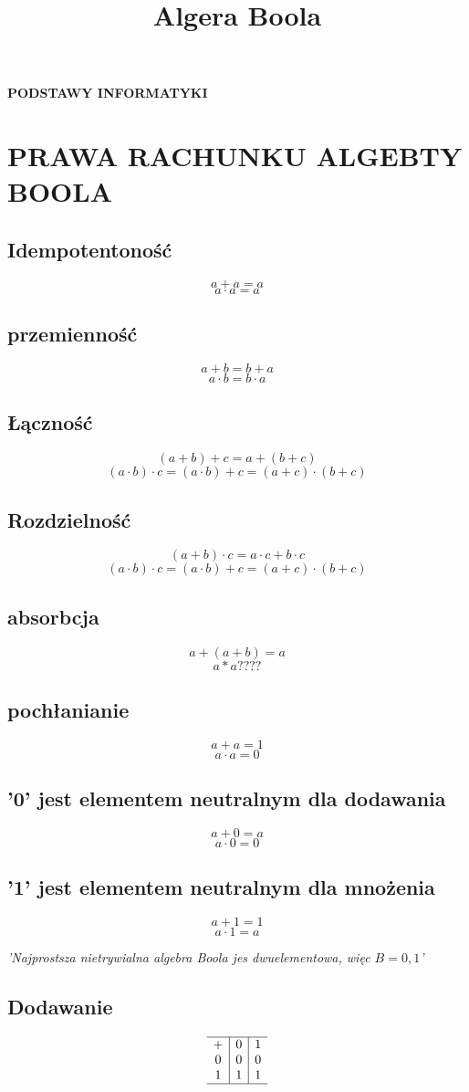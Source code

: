 \documentclass{article}
\title{Algera Boola}
\begin{document}
\begin{titlepage}
    \begin{center}
        \vspace*{1cm}
        
        \Huge

        \textbf{PODSTAWY INFORMATYKI}
        
        \vspace{3cm}
    \end{center}
\end{titlepage}
\newpage
\section{PRAWA RACHUNKU ALGEBTY BOOLA}
\subsection{Idempotentoność}
\[a + a = a\]
\[a \cdot a = a\]
\subsection{przemienność}
\[a + b = b + a\]
\[a \cdot b = b \cdot a\]
\subsection{Łączność}
\[(a + b) + c = a + (b + c)\]
\[(a \cdot b) \cdot c = (a \cdot b) + c = (a + c) \cdot (b + c)\]
\subsection{Rozdzielność}
\[(a + b) \cdot c = a \cdot c + b \cdot c\]
\[(a \cdot b) \cdot c = (a \cdot b) + c = (a + c) \cdot (b + c)\]
\subsection{absorbcja}
\[a + (a + b) = a\]
\[a * a ????\]
\subsection{pochłanianie}
\[a + a = 1\]
\[a \cdot a = 0\]
\subsection{'0' jest elementem neutralnym dla dodawania}
\[a + 0 = a\]
\[a \cdot 0 = 0\]
\subsection{'1' jest elementem neutralnym dla mnożenia}
\[a + 1 = 1\]
\[a \cdot 1 = a\]
\begin{center}
    \textit{'Najprostsza nietrywialna algebra Boola jes dwuelementowa, więc $B = {0,1}$'}
\end{center}
\subsection{Dodawanie}
\[
\begin{array}{c|c|c}
    \hline
    + & 0 & 1 \\
    0 & 0 & 0 \\
    1 & 1 & 1 \\
    \hline
\end{array}
\]
\end{document}
